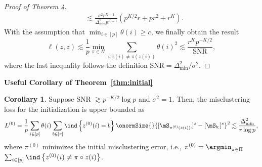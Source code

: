 \documentclass[lettersize,onecolumn,journal]{IEEEtran}
\theoremstyle{definition}
\newtheorem{cor}{Corollary}
\theoremstyle{definition}
\newcommand{\of}[1]{\left(#1\right)}
\newcommand{\offf}[1]{\left\{#1\right\}}
\begin{document}
\begin{proof}[Proof of Theorem 4]
\begin{align}
        & \lesssim \frac{\sigma^2 r^{K-1}}{ \Delta_{\min}^2  p^{K-1} } \of{ p^{K/2}r + pr^2 + r^K }.
    \end{align}
    With the assumption that $\min_{i \in [p]} \theta(i) \geq c$, we finally obtain the result
    \begin{equation}
        \ell(z, z) \lesssim \frac{1}{p}\min_{\pi \in \Pi} \sum_{i : \hat z(i) \neq \pi(z(i))} \theta(i)^2 \lesssim \frac{r^K p^{-K/2} }{ \text{SNR} },
    \end{equation}
    where the last inequality follows the definition $\text{SNR} = \Delta_{\min}^2/\sigma^2$.
\end{proof}

{\bf Useful Corollary of Theorem~\ref{thm:initial}} 

\begin{cor}\label{cor:L0} 
Suppose SNR $\gtrsim p^{-K/2} \log p$ and  $\sigma^2 = 1$. Then, the misclustering loss for the initialization is upper bounded as 
\begin{equation}
    L^{(0)} =  \frac{1}{p}  \sum_{i \in [p]} \theta(i) \sum_{b \in [r]}  \ind \offf{ z^{(0)}(i) = b } \onormSize{}{ [ \mS_{ \pi^{(0)}( z(i)):}  ]^s - [ \mS_{b:}  ]^s  }^2 \lesssim \frac{\Delta_{\min}^2}{r \log p},
\end{equation}
where $\pi^{(0)}$ minimizes the initial misclustering error, i.e., $\pi^{(0)} = \argmin_{\pi \in \Pi} $ $ \sum_{i \in [p]}\ind \offf{z^{(0)}(i) \neq \pi \circ z(i) }$.
\end{cor}
\end{document}
